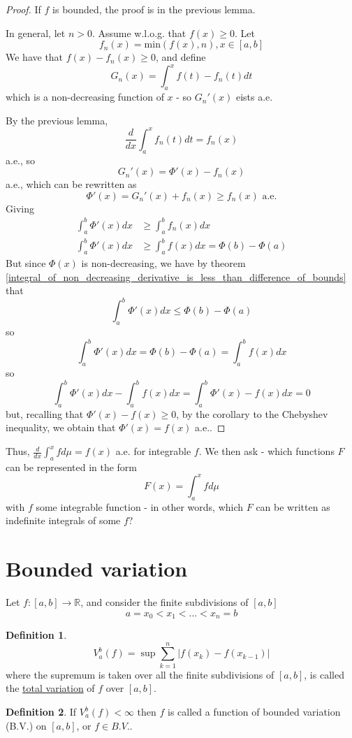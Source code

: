 \documentclass[11pt,a4paper]{report}
\theoremstyle{plain}
\theoremstyle{definition}
\newtheorem*{defn}{Definition}
\theoremstyle{remark}
\newcommand{\R}{\mathbb{R}}
\newcommand{\abs}[1]{\left| #1 \right|}
\begin{document}
\begin{proof}
  If $f$ is bounded, the proof is in the previous lemma.

  In general, let $n > 0$. Assume w.l.o.g. that $f(x) \ge 0$. Let
  $$ f_n(x) = \text{min}(f(x), n), x \in [a, b] $$
  We have that $f(x) - f_n(x) \ge 0$, and define
  $$ G_n(x) = \int_a^x f(t) - f_n(t) dt $$
  which is a non-decreasing function of $x$ - so $G_n'(x)$ eists a.e.

  By the previous lemma,
  $$ \frac{d}{dx} \int_a^x f_n(t) dt = f_n(x) $$
  a.e., so
  $$ G_n'(x) = \Phi'(x) - f_n(x) $$
  a.e., which can be rewritten as
  $$ \Phi'(x) = G_n'(x) + f_n(x) \ge f_n(x) \text{ a.e.} $$
  Giving
  \begin{align*}
    \int_a^b \Phi'(x) dx &\ge \int_a^b f_n(x) dx \\
    \int_a^b \Phi'(x) dx &\ge \int_a^b f(x) dx = \Phi(b) - \Phi(a)
  \end{align*}
  But since $\Phi(x)$ is non-decreasing, we have by theorem \ref{integral_of_non_decreasing_derivative_is_less_than_difference_of_bounds} that
  $$ \int_a^b \Phi'(x) dx \le \Phi(b) - \Phi(a)$$
  so
  $$ \int_a^b \Phi'(x) dx = \Phi(b) - \Phi(a) = \int_a^b f(x) dx $$
  so
  $$ \int_a^b \Phi'(x) dx - \int_a^b f(x) dx = \int_a^b \Phi'(x) - f(x) dx = 0 $$
  but, recalling that $\Phi'(x) - f(x) \ge 0$, by the corollary to the Chebyshev inequality, we obtain that $\Phi'(x) = f(x)$ a.e..
\end{proof}

Thus, $\frac{d}{dx}\int_a^x f d\mu = f(x)$ a.e. for integrable $f$. We then ask - which functions $F$ can be represented in the form
$$ F(x) = \int_a^x f d\mu $$
with $f$ some integrable function - in other words, which $F$ can be written as indefinite integrals of some $f$?

\section{Bounded variation}

Let $f: [a, b] \to \R$, and consider the finite subdivisions of $[a, b]$
$$ a = x_0 < x_1 < \dots < x_n = b $$

\begin{defn}
  $$ V_a^b (f) = \sup \sum_{k=1}^n \abs{f(x_k) - f(x_{k-1})} $$
  where the supremum is taken over all the finite subdivisions of $[a, b]$, is called the \underline{total variation} of $f$ over $[a, b]$.
\end{defn}

\begin{defn}
    If $V_a^b(f) < \infty$ then $f$ is called a function of bounded variation (B.V.) on $[a, b]$, or $f \in B.V.$.
\end{defn}
\end{document}
